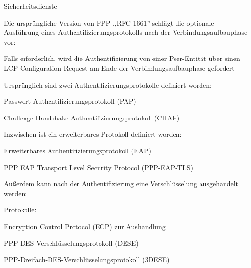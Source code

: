 \documentclass[a4paper]{article}
\begin{document}
\begin{multicols}{3}
      Sicherheitsdienste
      \begin{itemize*}
            \item Die ursprüngliche Version von PPP ,,RFC 1661'' schlägt die optionale
            Ausführung eines Authentifizierungsprotokolls nach der
            Verbindungsaufbauphase vor:
            \begin{itemize*}
                  \item Falls erforderlich, wird die Authentifizierung von einer Peer-Entität über einen LCP Configuration-Request am Ende der Verbindungsaufbauphase gefordert
                  \item Ursprünglich sind zwei Authentifizierungsprotokolle definiert worden:
                  \begin{itemize*}
                        \item Passwort-Authentifizierungsprotokoll (PAP)
                        \item Challenge-Handshake-Authentifizierungsprotokoll (CHAP)
                  \end{itemize*}
                  \item Inzwischen ist ein erweiterbares Protokoll definiert worden:
                  \begin{itemize*}
                        \item Erweiterbares Authentifizierungsprotokoll (EAP)
                        \item PPP EAP Transport Level Security Protocol (PPP-EAP-TLS)
                  \end{itemize*}
            \end{itemize*}
            \item Außerdem kann nach der Authentifizierung eine Verschlüsselung
            ausgehandelt werden:
            \begin{itemize*}
                  \item Protokolle:
                  \begin{itemize*}
                        \item Encryption Control Protocol (ECP) zur Aushandlung
                        \item PPP DES-Verschlüsselungsprotokoll (DESE)
                        \item PPP-Dreifach-DES-Verschlüsselungsprotokoll (3DESE)
                  \end{itemize*}
            \end{itemize*}
      \end{itemize*}


\end{multicols}
\end{document}
